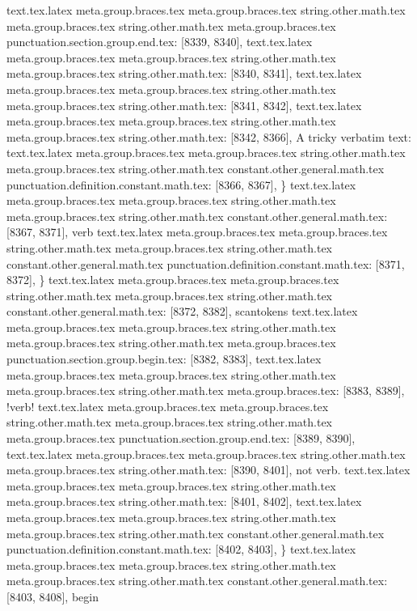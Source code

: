 {{{{{{{{{{{{{{{{{{{{{{{{{{{{{{{{{{{{{{{{{{{{{{{{{{{{{{{{{{{{{{{{{{{{{{{{{{{{{{{{{{{{{{{{{{{{{{{{{{{{{{{{{{{{{{{{{{{{{{{{{{{{{{{{{{{{{{{{{{{{{{{{{{{{{{{{{{{{{{{{{{{{{{{{{{{{{{{{{{{{{{{{{{{{{{{{{{{{{{{{{{{{{{{{{{{{{{{{{{{{{{{{{{{{{{{{{{{{{{{{{{{{{text.tex.latex meta.group.braces.tex meta.group.braces.tex string.other.math.tex meta.group.braces.tex string.other.math.tex meta.group.braces.tex punctuation.section.group.end.tex: [8339, 8340], {}}
text.tex.latex meta.group.braces.tex meta.group.braces.tex string.other.math.tex meta.group.braces.tex string.other.math.tex: [8340, 8341], {
}
text.tex.latex meta.group.braces.tex meta.group.braces.tex string.other.math.tex meta.group.braces.tex string.other.math.tex: [8341, 8342], {
}
text.tex.latex meta.group.braces.tex meta.group.braces.tex string.other.math.tex meta.group.braces.tex string.other.math.tex: [8342, 8366], {A tricky verbatim text: }
text.tex.latex meta.group.braces.tex meta.group.braces.tex string.other.math.tex meta.group.braces.tex string.other.math.tex constant.other.general.math.tex punctuation.definition.constant.math.tex: [8366, 8367], {\}
text.tex.latex meta.group.braces.tex meta.group.braces.tex string.other.math.tex meta.group.braces.tex string.other.math.tex constant.other.general.math.tex: [8367, 8371], {verb}
text.tex.latex meta.group.braces.tex meta.group.braces.tex string.other.math.tex meta.group.braces.tex string.other.math.tex constant.other.general.math.tex punctuation.definition.constant.math.tex: [8371, 8372], {\}
text.tex.latex meta.group.braces.tex meta.group.braces.tex string.other.math.tex meta.group.braces.tex string.other.math.tex constant.other.general.math.tex: [8372, 8382], {scantokens}
text.tex.latex meta.group.braces.tex meta.group.braces.tex string.other.math.tex meta.group.braces.tex string.other.math.tex meta.group.braces.tex punctuation.section.group.begin.tex: [8382, 8383], {{}
text.tex.latex meta.group.braces.tex meta.group.braces.tex string.other.math.tex meta.group.braces.tex string.other.math.tex meta.group.braces.tex: [8383, 8389], {!verb!}
text.tex.latex meta.group.braces.tex meta.group.braces.tex string.other.math.tex meta.group.braces.tex string.other.math.tex meta.group.braces.tex punctuation.section.group.end.tex: [8389, 8390], {}}
text.tex.latex meta.group.braces.tex meta.group.braces.tex string.other.math.tex meta.group.braces.tex string.other.math.tex: [8390, 8401], { not verb.
}
text.tex.latex meta.group.braces.tex meta.group.braces.tex string.other.math.tex meta.group.braces.tex string.other.math.tex: [8401, 8402], {
}
text.tex.latex meta.group.braces.tex meta.group.braces.tex string.other.math.tex meta.group.braces.tex string.other.math.tex constant.other.general.math.tex punctuation.definition.constant.math.tex: [8402, 8403], {\}
text.tex.latex meta.group.braces.tex meta.group.braces.tex string.other.math.tex meta.group.braces.tex string.other.math.tex constant.other.general.math.tex: [8403, 8408], {begin}
}}}}}}}}}}}}}}}}}}}}}}}}}}}}}}}}}}}}}}}}}}}}}}}}}}}}}}}}}}}}}}}}}}}}}}}}}}}}}}}}}}}}}}}}}}}}}}}}}}}}}}}}}}}}}}}}}}}}}}}}}}}}}}}}}}}}}}}}}}}}}}}}}}}}}}}}}}}}}}}}}}}}}}}}}}}}}}}}}}}}}}}}}}}}}}}}}}}}}}}}}}}}}}}}}}}}}}}}}}}}}}}}}}}}}}}}}}}}}}}}}}}}}}}
